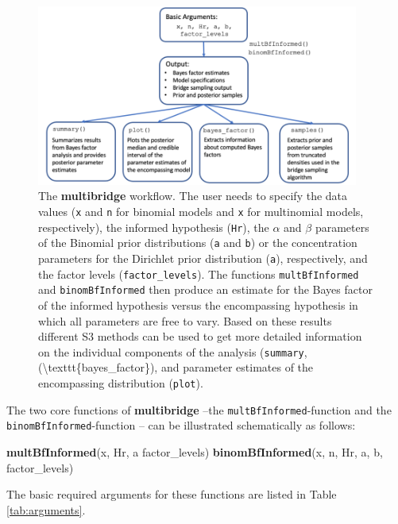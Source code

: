 \documentclass[
  english,
  man,floatsintext]{apa6}
\newenvironment{Shaded}{\begin{snugshade}}{\end{snugshade}}
\newcommand{\KeywordTok}[1]{\textcolor[rgb]{0.13,0.29,0.53}{\textbf{#1}}}
\newcommand{\NormalTok}[1]{#1}
\begin{document}
\begin{figure}
\includegraphics[width=400px]{scheme_multibridge} \caption[(fig:scheme-multibridge)]{The \textbf{multibridge} workflow. The user needs to specify the data values (\texttt{x} and \texttt{n} for binomial models and \texttt{x} for multinomial models, respectively), the informed hypothesis (\texttt{Hr}), the \(\alpha\) and \(\beta\) parameters of the Binomial prior distributions (\texttt{a} and \texttt{b}) or the concentration parameters for the Dirichlet prior distribution (\texttt{a}), respectively, and the factor levels (\texttt{factor\_levels}). The functions \texttt{multBfInformed} and \texttt{binomBfInformed} then produce an estimate for the Bayes factor of the informed hypothesis versus the encompassing hypothesis in which all parameters are free to vary. Based on these results different S3 methods can be used to get more detailed information on the individual components of the analysis (\texttt{summary}, (\textbackslash texttt\{bayes\_factor\}), and parameter estimates of the encompassing distribution (\texttt{plot}).}\label{fig:scheme-multibridge}
\end{figure}

The two core functions of \textbf{multibridge} --the \texttt{multBfInformed}-function and the \texttt{binomBfInformed}-function -- can be illustrated schematically as follows:

\begin{Shaded}
\begin{Highlighting}[]
\KeywordTok{multBfInformed}\NormalTok{(x, Hr, a factor\_levels)}
\KeywordTok{binomBfInformed}\NormalTok{(x, n, Hr, a, b, factor\_levels)}
\end{Highlighting}
\end{Shaded}

The basic required arguments for these functions are listed in Table \ref{tab:arguments}.
\end{document}
